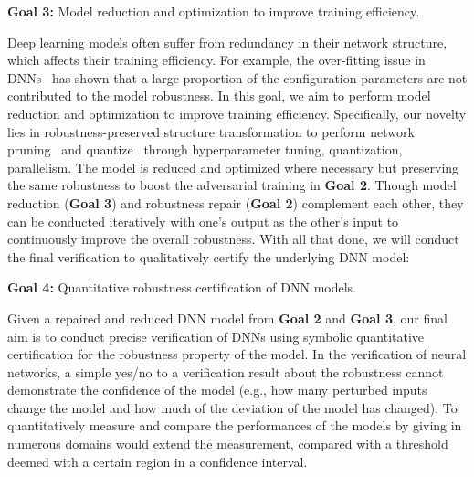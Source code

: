 \noindent
\begin{formal}
{\bf Goal 3:} Model reduction and optimization to  improve training efficiency.
\end{formal}
\noindent
Deep learning models often suffer from redundancy in their network structure, which affects their training efficiency. For example, the over-fitting issue in DNNs~\cite{denil2013predicting} has shown that a large proportion of the configuration parameters are not contributed to the model robustness. 
In this goal, we aim to perform model reduction and optimization to improve training efficiency. Specifically, our novelty lies in robustness-preserved structure transformation to perform network pruning~\cite{han2015learning,luo2017thinet} and  quantize~\cite{ullrich2017soft} through hyperparameter tuning, quantization, parallelism.
The model is reduced and optimized where necessary but preserving the same robustness to boost the adversarial training in \textbf{Goal 2}. Though model reduction (\textbf{Goal 3}) and robustness repair (\textbf{Goal 2}) complement each other, they can be conducted iteratively with one's output as the other's input to continuously improve the overall robustness.
With all that done, we will conduct the final verification to qualitatively certify the underlying DNN model: 
  \noindent
\begin{formal}
{\bf Goal 4:} Quantitative robustness certification of DNN models. 
\end{formal}
\noindent  
Given a repaired and reduced DNN model from \textbf{Goal 2} and \textbf{Goal 3}, our final aim is to conduct precise verification of DNNs using symbolic quantitative certification for the robustness property of the model. 
In the verification of neural networks, a simple yes/no to a verification result about the robustness cannot demonstrate the confidence of the model (e.g., how many perturbed inputs change the model and how much of the deviation of the model has changed). To quantitatively measure and compare the performances of the models by giving in numerous domains would extend the measurement, compared with a threshold deemed with a certain region in a confidence interval. 


